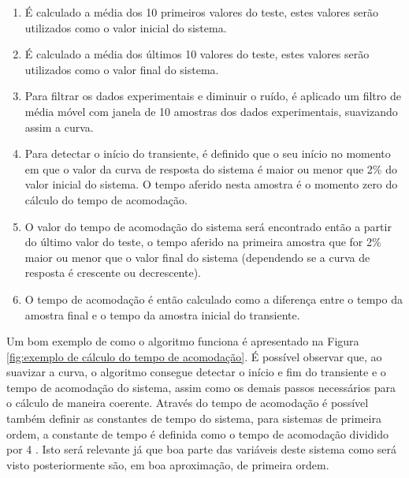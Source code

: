 \begin{enumerate}   
    \item É calculado a média dos 10 primeiros valores do teste, estes valores serão utilizados como o valor inicial do sistema.
    \item É calculado a média dos últimos 10 valores do teste, estes valores serão utilizados como o valor final do sistema.
    \item Para filtrar os dados experimentais e diminuir o ruído, é aplicado um filtro de média móvel com janela de 10 amostras dos dados experimentais, suavizando assim a curva.
    \item Para detectar o início do transiente, é definido que o seu início no momento em que o valor da curva de resposta do sistema é maior ou menor que 2\% do valor inicial do sistema. O tempo aferido nesta amostra é o momento zero do cálculo do tempo de acomodação.
    \item O valor do tempo de acomodação do sistema será encontrado então a partir do último valor do teste, o tempo aferido na primeira amostra que for 2\% maior ou menor que o valor final do sistema (dependendo se a curva de resposta é crescente ou decrescente).
    \item O tempo de acomodação é então calculado como a diferença entre o tempo da amostra final e o tempo da amostra inicial do transiente.
\end{enumerate}

Um bom exemplo de como o algoritmo funciona é apresentado na Figura \ref{fig:exemplo de cálculo do tempo de acomodação}. É possível observar que, ao suavizar a curva, o algoritmo consegue detectar o início e fim do transiente e o tempo de acomodação do sistema, assim como os demais passos necessários para o cálculo de maneira coerente. Através do tempo de acomodação é possível também definir as constantes de tempo do sistema, para sistemas de primeira ordem, a constante de tempo é definida como o tempo de acomodação dividido por 4 \cite{ogataControle}. Isto será relevante já que boa parte das variáveis deste sistema como será visto posteriormente são, em boa aproximação, de primeira ordem.


